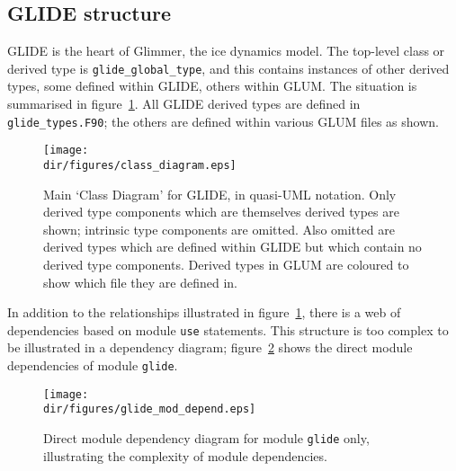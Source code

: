 \subsection{GLIDE structure}
%
GLIDE is the heart of Glimmer, the ice dynamics model. The top-level class or
derived type is \texttt{glide\_global\_type}, and this contains instances of
other derived types, some defined within GLIDE, others within GLUM. The
situation is summarised in figure~\ref{dg.fig.glide_class_diagram}. All GLIDE
derived types are defined in \texttt{glide\_types.F90}; the others are defined
within various GLUM files as shown.
%
\begin{figure}[htbp]
\centering
\texttt{[image: \\dir/figures/class\_diagram.eps]}
\caption{Main `Class Diagram' for GLIDE, in quasi-UML notation. Only derived type components which
  are themselves derived types are shown; intrinsic type components are
  omitted. Also omitted are derived types which are defined within GLIDE but
  which contain no derived type components. Derived types in GLUM are
  coloured to show which file they are defined in.}
\label{dg.fig.glide_class_diagram}
\end{figure}

In addition to the relationships illustrated in
figure~\ref{dg.fig.glide_class_diagram}, there is a web of dependencies based
on module \texttt{use} statements. This structure is too complex to be
illustrated in a dependency diagram; figure~\ref{dg.fig.glide_mod_depend} shows the direct module
dependencies of module \texttt{glide}.
%
\begin{figure}[htbp]
\centering
\texttt{[image: \\dir/figures/glide\_mod\_depend.eps]}
\caption{Direct module dependency diagram for module \texttt{glide} only,
  illustrating the complexity of module dependencies.}
\label{dg.fig.glide_mod_depend}
\end{figure}


